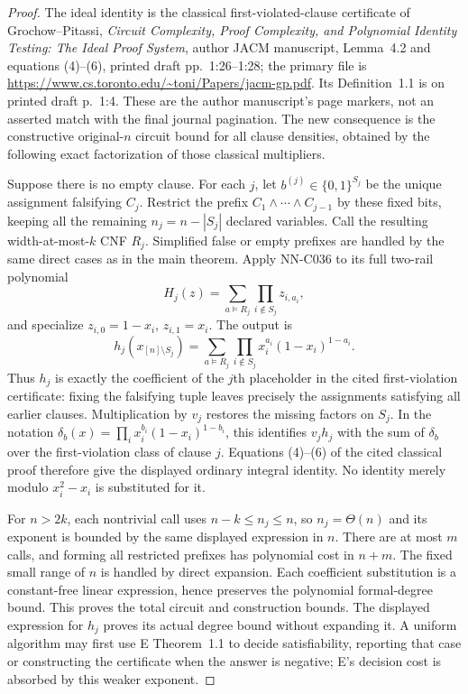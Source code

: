 \begin{proof}
The ideal identity is the classical first-violated-clause
certificate of Grochow--Pitassi, \emph{Circuit Complexity, Proof
Complexity, and Polynomial Identity Testing: The Ideal Proof
System}, author JACM manuscript, Lemma~4.2 and equations
(4)--(6), printed draft pp.~1:26--1:28; the primary file is
\url{https://www.cs.toronto.edu/~toni/Papers/jacm-gp.pdf}.
Its Definition~1.1 is on printed draft p.~1:4.  These are
the author manuscript's page markers, not an asserted match
with the final journal pagination.  The new consequence is
the constructive original-$n$ circuit bound for all clause
densities, obtained by the following exact factorization of
those classical multipliers.

Suppose there is no empty clause.  For each $j$, let
$b^{(j)}\in\{0,1\}^{S_j}$ be the unique assignment falsifying
$C_j$.  Restrict the prefix $C_1\wedge\cdots\wedge C_{j-1}$
by these fixed bits, keeping all the remaining $n_j=n-|S_j|$
declared variables.  Call the resulting width-at-most-$k$
CNF $R_j$.  Simplified false or empty prefixes are handled
by the same direct cases as in the main theorem.  Apply
NN-C036 to its full two-rail polynomial
\[
 H_j(z)=\sum_{a\models R_j}\prod_{i\notin S_j}z_{i,a_i},
\]
and specialize $z_{i,0}=1-x_i$, $z_{i,1}=x_i$.  The output is
\[
 h_j(x_{[n]\setminus S_j})=
 \sum_{a\models R_j}\prod_{i\notin S_j}
                       x_i^{a_i}(1-x_i)^{1-a_i}.
\]
Thus $h_j$ is exactly the coefficient of the $j$th placeholder
in the cited first-violation certificate: fixing the falsifying
tuple leaves precisely the assignments satisfying all earlier
clauses.  Multiplication by $v_j$ restores the missing factors
on $S_j$.  In the notation
$\delta_b(x)=\prod_i x_i^{b_i}(1-x_i)^{1-b_i}$, this identifies
$v_jh_j$ with the sum of $\delta_b$ over the first-violation
class of clause $j$.  Equations (4)--(6) of the cited classical
proof therefore give the displayed ordinary integral identity.
No identity merely modulo $x_i^2-x_i$ is substituted for it.

For $n>2k$, each nontrivial call uses $n-k\le n_j\le n$,
so $n_j=\Theta(n)$ and its exponent is bounded by the same
displayed expression in $n$.  There are at most $m$ calls,
and forming all restricted prefixes has polynomial cost
in $n+m$.  The fixed small range of $n$ is handled by direct
expansion.  Each coefficient substitution is a constant-free
linear expression, hence preserves the polynomial formal-degree
bound.  This proves the total circuit and construction bounds.
The displayed expression for $h_j$ proves its actual degree
bound without expanding it.  A uniform algorithm may first
use E Theorem~1.1 to decide satisfiability, reporting that
case or constructing the certificate when the answer is
negative; E's decision cost is absorbed by this weaker exponent.


\end{proof}
